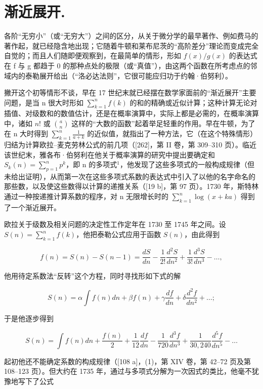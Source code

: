\chapter{渐近展开.}

各阶“无穷小”（或“无穷大”）之间的区分，从关于微分学的最早著作、例如费马的著作起，就已经隐含地出现；它随着牛顿和莱布尼茨的“高阶差分”理论而变成完全自觉的；而且人们随即便观察到，在最简单的情形，形如 \(f(x)/g(x)\) 的表达式在 f 与 g 都趋于 0 的那种点处的极限（或“真值”），由这两个函数在所考虑点的邻域内的泰勒展开给出（“洛必达法则”，它很可能应归功于约翰·伯努利）。

撇开这个初等情形不谈，早在 17 世纪末就已经摆在数学家面前的“渐近展开”主要问题，是当 n 很大时形如 \(\sum_{k=1}^{n}f(k)\) 的和的精确或近似计算；这种计算无论对插值、对级数和的数值估计，还是在概率演算中，实际上都是必需的，在概率演算中，诸如 \(n!\) 或 \(\binom{a}{n}\) 这样的“大数的函数”起着举足轻重的作用。早在牛顿，为了在 n 大时得到 \(\sum_{k=1}^{n}\frac{1}{a+k}\) 的近似值，就指出了一种方法，它（在这个特殊情形）归结为计算欧拉–麦克劳林公式的前几项（{[}262{]}，第 II 卷，第 309–310 页）。临近该世纪末，雅各布·伯努利在他关于概率演算的研究中提出要确定和 \(S_{k}(n)=\sum_{p=1}^{n}p^{k}\)，即 n 的多项式\(^{1}\)，他发现了这些多项式的一般构成规律（但未给出证明），从而第一次在这些多项式系数的表达式中引入了以他的名字命名的那些数，以及使这些数得以计算的递推关系（{[}19 b{]}，第 97 页）。1730 年，斯特林通过一种按递推计算系数的程序，对 n 无限增长时的 \(\sum_{k=1}^{n}\log(x+ka)\) 得到了一个渐近展开。

欧拉关于级数及相关问题的决定性工作定年在 1730 至 1745 年之间。设 \(S(n) = \sum_{k=1}^{n} f(k)\)，他把泰勒公式应用于函数 \(S(n)\)，由此得到

\[
f (n) = S (n) - S (n - 1) = \frac {d S}{d n} - \frac {1}{2 !} \frac {d ^ {2} S}{d n ^ {2}} + \frac {1}{3 !} \frac {d ^ {3} S}{d n ^ {3}} - \dots ,
\]

他用待定系数法“反转”这个方程，同时寻找形如下式的解

\[
S (n) = \alpha \int f (n) d n + \beta f (n) + \gamma \frac {d f}{d n} + \delta \frac {d ^ {2} f}{d n ^ {2}} + \dots ;
\]

于是他逐步得到

\[
S (n) = \int f (n) d n + \frac {f (n)}{2} + \frac {1}{12} \frac {d f}{d n} - \frac {1}{720} \frac {d ^ {3} f}{d n ^ {3}} + \frac {1}{30,240} \frac {d ^ {5} f}{d n ^ {5}} - \dots
\]

起初他还不能确定系数的构成规律（{[}108 a{]}，(1)，第 XIV 卷，第 42–72 页及第 108–123 页）。但大约在 1735 年，通过与多项式分解为一次因式的类比，他毫不犹豫地写下了公式

